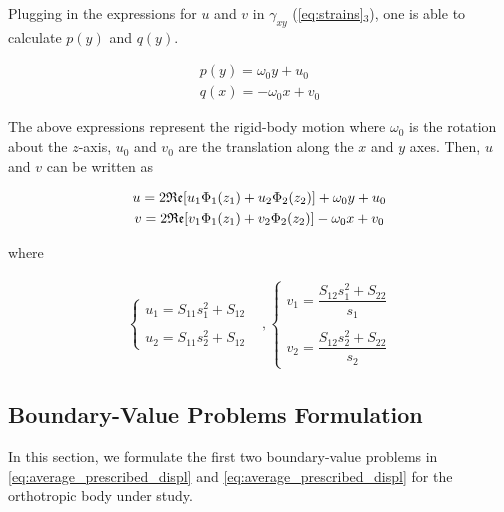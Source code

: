 \documentclass{article}
\begin{document}
Plugging in the expressions for $u$ and $v$ in $\gamma_{xy}$ (\cref{eq:strains}$_3$), one is able to calculate $p(y)$ and $q(y)$.

\begin{equation*}
    \begin{matrix}
    p(y) = \omega_0 y + u_0   \\ 
    q(x) = -\omega_0 x + v_0
    \end{matrix}
\end{equation*}

The above expressions represent the rigid-body motion where $\omega_0$ is the rotation about the $z$-axis, $u_0$ and $v_0$ are the translation along the $x$ and $y$ axes. Then, $u$ and $v$ can be written as

\begin{gather}
    u = 2 \mathfrak{Re}[u_1 \Phi_1(z_1) + u_2 \Phi_2(z_2)] + \omega_0 y + u_0  \notag \\
    v = 2 \mathfrak{Re}[v_1 \Phi_1(z_1) + v_2 \Phi_2(z_2)] - \omega_0 x + v_0
    \label{eq:displacements}
\end{gather}

where

\begin{equation}
    \begin{matrix}
    \left\{\begin{matrix}
    u_1 = S_{11} s_1^2 + S_{12}   \\ 
    \\
    u_2 = S_{11} s_2^2 + S_{12}
    \end{matrix}\right. & , 
    \left\{\begin{matrix}
    v_1 = \dfrac{S_{12} s_1^2 + S_{22}}{s_1}   \\
    \\
    v_2 = \dfrac{S_{12} s_2^2 + S_{22}}{s_2}
    \end{matrix}\right.
    \end{matrix}
    \label{eq:u_v}
\end{equation}


\subsection{Boundary-Value Problems Formulation}\label{sec:bvp}
In this section, we formulate the first two boundary-value problems in \cref{eq:average_prescribed_displ} and \cref{eq:average_prescribed_displ} for the orthotropic body under study.
\end{document}

